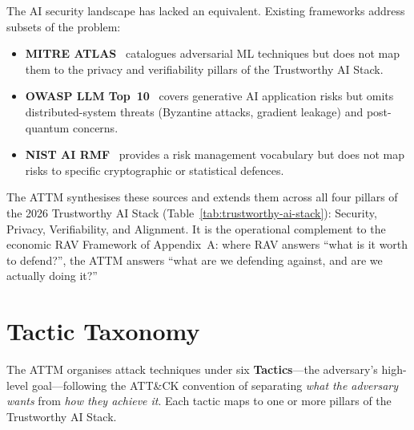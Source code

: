 The AI security landscape has lacked an equivalent.  Existing frameworks
address subsets of the problem:

\begin{itemize}
  \item \textbf{MITRE ATLAS}~\cite{mitre-atlas-2023} catalogues
        adversarial ML techniques but does not map them to the privacy
        and verifiability pillars of the Trustworthy AI Stack.
  \item \textbf{OWASP LLM Top~10}~\cite{owasp-llm-2023} covers
        generative AI application risks but omits distributed-system
        threats (Byzantine attacks, gradient leakage) and
        post-quantum concerns.
  \item \textbf{NIST AI RMF}~\cite{nist-ai-rmf-2026} provides a risk
        management vocabulary but does not map risks to specific
        cryptographic or statistical defences.
\end{itemize}

The ATTM synthesises these sources and extends them across all four
pillars of the 2026 Trustworthy AI Stack
(Table~\ref{tab:trustworthy-ai-stack}): Security, Privacy,
Verifiability, and Alignment.  It is the operational complement to
the economic RAV Framework of Appendix~A: where RAV answers
``what is it worth to defend?'', the ATTM answers
``what are we defending against, and are we actually doing it?''

\section{Tactic Taxonomy}
\label{sec:attm-taxonomy}

The ATTM organises attack techniques under six \textbf{Tactics}---the
adversary's high-level goal---following the ATT\&CK convention of
separating \emph{what the adversary wants} from \emph{how they achieve
it}.  Each tactic maps to one or more pillars of the Trustworthy AI
Stack.

